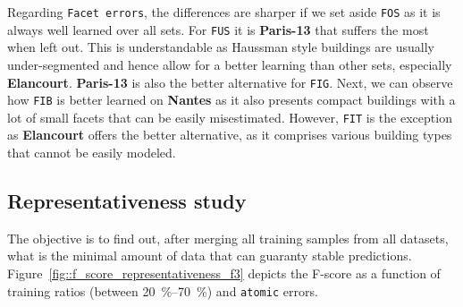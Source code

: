         Regarding \texttt{Facet errors}, the differences are sharper if we set aside \texttt{FOS} as it is always well learned over all sets.
        For \texttt{FUS} it is \textbf{Paris-13} that suffers the most when left out.
        This is understandable as Haussman style buildings are usually under-segmented and hence allow for a better learning than other sets, especially \textbf{Elancourt}.
        \textbf{Paris-13} is also the better alternative for \texttt{FIG}.
        Next, we can observe how \texttt{FIB} is better learned on \textbf{Nantes} as it also presents compact buildings with a lot of small facets that can be easily misestimated.
        However, \texttt{FIT} is the exception as \textbf{Elancourt} offers the better alternative, as it comprises various building types that cannot be easily modeled.
    
    \subsection{Representativeness study}
        \label{subsec::more_experiments::scalability::representativeness}
        The objective is to find out, after merging all training samples from all datasets, what is the minimal amount of data that can guaranty stable predictions.
        Figure~\ref{fig::f_score_representativeness_f3} depicts the F-score as a function of training ratios (between \SIrange[range-phrase={ and }]{20}{70}{\percent}) and \texttt{atomic} errors.\\
                
        \begin{figure}[htbp]
        \end{figure}
            
